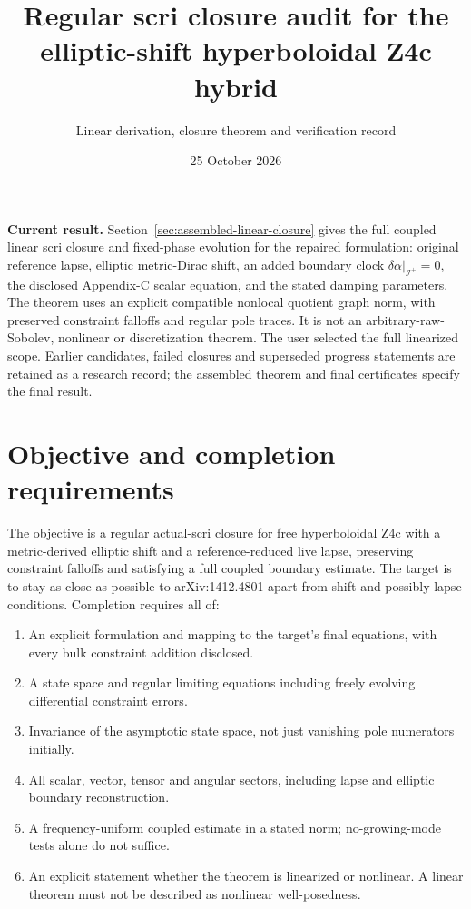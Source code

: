 \documentclass[11pt]{article}
\title{Regular scri closure audit for the elliptic-shift hyperboloidal Z4c hybrid}
\author{Linear derivation, closure theorem and verification record}
\date{25 October 2026}
\newcommand{\scri}{\mathscr I^+}
\begin{document}
\maketitle
\noindent\textbf{Current result.} Section~\ref{sec:assembled-linear-closure} gives the full coupled linear scri closure and fixed-phase evolution for the repaired formulation: original reference lapse, elliptic metric-Dirac shift, an added boundary clock $\delta\alpha|_{\scri}=0$, the disclosed Appendix-C scalar equation, and the stated damping parameters. The theorem uses an explicit compatible nonlocal quotient graph norm, with preserved constraint falloffs and regular pole traces. It is not an arbitrary-raw-Sobolev, nonlinear or discretization theorem. The user selected the full linearized scope. Earlier candidates, failed closures and superseded progress statements are retained as a research record; the assembled theorem and final certificates specify the final result.
\tableofcontents

\section{Objective and completion requirements}
The objective is a regular actual-scri closure for free hyperboloidal Z4c with a metric-derived elliptic shift and a reference-reduced live lapse, preserving constraint falloffs and satisfying a full coupled boundary estimate. The target is to stay as close as possible to arXiv:1412.4801 apart from shift and possibly lapse conditions. Completion requires all of:
\begin{enumerate}
\item An explicit formulation and mapping to the target's final equations, with every bulk constraint addition disclosed.
\item A state space and regular limiting equations including freely evolving differential constraint errors.
\item Invariance of the asymptotic state space, not just vanishing pole numerators initially.
\item All scalar, vector, tensor and angular sectors, including lapse and elliptic boundary reconstruction.
\item A frequency-uniform coupled estimate in a stated norm; no-growing-mode tests alone do not suffice.
\item An explicit statement whether the theorem is linearized or nonlinear. A linear theorem must not be described as nonlinear well-posedness.
\end{enumerate}
\end{document}
